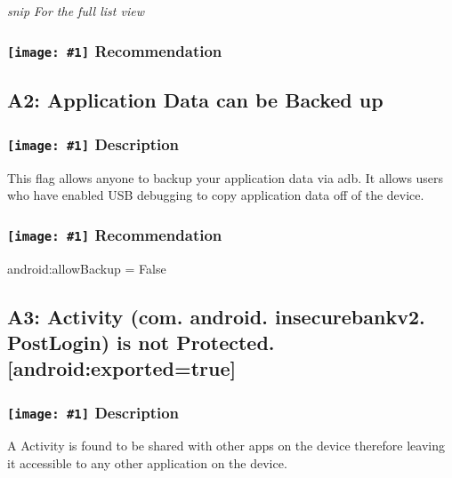 \documentclass[12p]{article}
\newcommand{\icon}[1]{\texttt{[image: \#1]}}
\begin{document}




\textit{snip}
\newline \textsl{For the full list view }
\subsubsection*{\protect\icon{/home/miki/Documents/GITHUB/AndroidPermissions/python/vulns/report_icons/basic_todo.png} Recommendation}

\subsection{A2: Application Data can be Backed up}
\subsubsection*{\protect\icon{/home/miki/Documents/GITHUB/AndroidPermissions/python/vulns/report_icons/basic_sheet.png} Description}
This flag allows anyone to backup your application data via adb. It allows users who have enabled USB debugging to copy application data off of the device.
\subsubsection*{\protect\icon{/home/miki/Documents/GITHUB/AndroidPermissions/python/vulns/report_icons/basic_todo.png} Recommendation}
android:allowBackup = False
\subsection{A3: Activity (com. android. insecurebankv2. PostLogin) is not Protected. [android:exported=true]}
\subsubsection*{\protect\icon{/home/miki/Documents/GITHUB/AndroidPermissions/python/vulns/report_icons/basic_sheet.png} Description}
A Activity is found to be shared with other apps on the device therefore leaving it accessible to any other application on the device.
\end{document}
